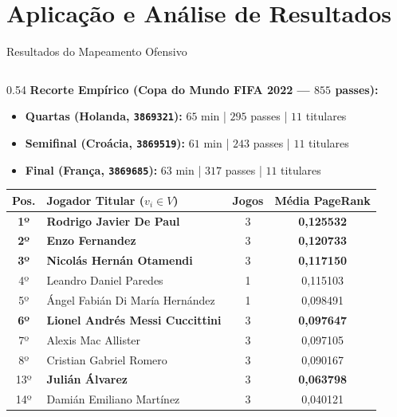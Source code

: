 \documentclass[aspectratio=1610,10pt]{beamer}
\begin{document}
\section{Aplicação e Análise de Resultados}
\begin{frame}{Resultados do Mapeamento Ofensivo}
  \begin{columns}[T,onlytextwidth]
    \begin{column}{0.54\textwidth}
      \scriptsize
      \textbf{Recorte Empírico (Copa do Mundo FIFA 2022 --- $855$ passes):}
      \begin{itemize}
        \setlength{\itemsep}{2pt}
        \item \textbf{Quartas (Holanda, \texttt{3869321}):} $65$ min | $295$ passes | $11$ titulares
        \item \textbf{Semifinal (Croácia, \texttt{3869519}):} $61$ min | $243$ passes | $11$ titulares
        \item \textbf{Final (França, \texttt{3869685}):} $63$ min | $317$ passes | $11$ titulares
      \end{itemize}
      \vspace{0.1cm}
      \centering
      \begin{tabularx}{\linewidth}{c X c c}
        \toprule
        \textbf{Pos.} & \textbf{Jogador Titular ($v_i \in V$)} & \textbf{Jogos} & \textbf{Média PageRank} \\
        \midrule
        \textbf{1º} & \textbf{Rodrigo Javier De Paul}          & 3 & \textbf{0,125532} \\
        \textbf{2º} & \textbf{Enzo Fernandez}                  & 3 & \textbf{0,120733} \\
        \textbf{3º} & \textbf{Nicolás Hernán Otamendi}         & 3 & \textbf{0,117150} \\
        4º          & Leandro Daniel Paredes                   & 1 & 0,115103 \\
        5º          & Ángel Fabián Di María Hernández          & 1 & 0,098491 \\
        \textbf{6º} & \textbf{Lionel Andrés Messi Cuccittini}  & 3 & \textbf{0,097647} \\
        7º          & Alexis Mac Allister                      & 3 & 0,097105 \\
        8º          & Cristian Gabriel Romero                  & 3 & 0,090167 \\
        13º         & \textbf{Julián Álvarez}                  & 3 & \textbf{0,063798} \\
        14º         & Damián Emiliano Martínez                 & 3 & 0,040121 \\

\end{tabularx}
\end{column}
\end{columns}
\end{frame}
\end{document}
